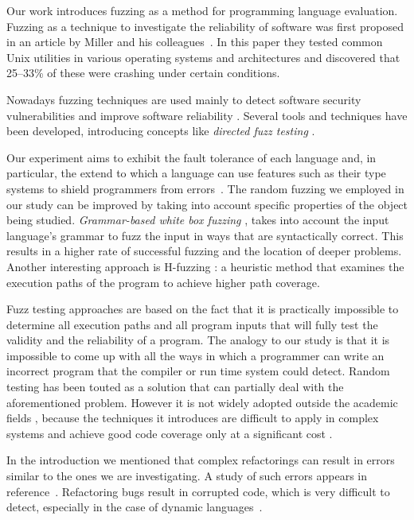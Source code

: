 \documentclass[10pt]{sigplanconf}
\begin{document}
Our work introduces fuzzing as a method for programming language
evaluation.
Fuzzing as a technique to investigate the reliability of software
was first proposed in an article by Miller and his colleagues~\cite{MFS90}.
In this paper they tested common Unix
utilities in various operating systems and architectures and discovered that
25--33\% of these were crashing under certain conditions.

Nowadays fuzzing techniques are used mainly to detect software security
vulnerabilities and improve software reliability \cite{TJC08,GODE07}.
Several tools and techniques \cite{WWGZ11} have been developed,
introducing concepts like \textit{directed fuzz testing} \cite{GLRI09}.

Our experiment aims to exhibit the fault tolerance of each language
and, in particular, the extend to which a language can use features such as
their type systems to shield programmers from errors~\cite{LYU95,KOKR07}.
The random fuzzing we employed in our study can be improved by taking
into account specific properties of the object being studied.
{\em Grammar-based white box fuzzing} \cite{God08},
takes into account the input language's grammar to fuzz the input in
ways that are syntactically correct.
This results in a higher rate of successful fuzzing and the location
of deeper problems.
Another interesting approach is H-fuzzing \cite{ZWZH11}:
a heuristic method that examines the execution paths of the program
to achieve higher path coverage.

Fuzz testing approaches are based on the fact that it is practically
impossible to determine all execution paths and all program inputs that will
fully test the validity and the reliability of a program.
The analogy to our study is that it is impossible to come up with all
the ways in which a programmer can write an incorrect program that the
compiler or run time system could detect.
Random testing \cite{HAM06} has been touted as a solution that can partially
deal with the aforementioned problem.
However it is not widely adopted outside the academic fields \cite{GGBO07},
because the techniques it introduces are difficult to apply
in complex systems and achieve good code coverage only at a significant cost
\cite{RAWO06}.

In the introduction we mentioned that complex refactorings can
result in errors similar to the ones we are investigating.
A study of such errors appears in reference~\cite{DDGM07}.
Refactoring bugs result in corrupted code,
which is very difficult to detect, especially in the case of dynamic
languages~\cite{SCHA12,FFM11}.
\end{document}
